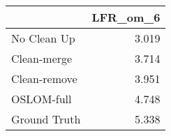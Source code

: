 \begin{tabular}{lr}
\toprule
{} & LFR_om_6 \\
\midrule
No Clean Up  &    3.019 \\
Clean-merge  &    3.714 \\
Clean-remove &    3.951 \\
OSLOM-full   &    4.748 \\
Ground Truth &    5.338 \\
\bottomrule
\end{tabular}
